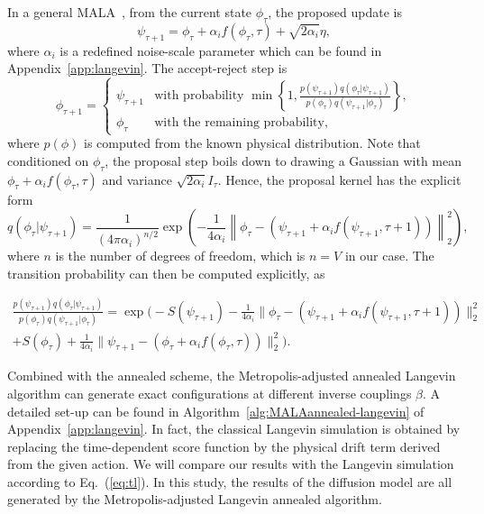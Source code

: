 \documentclass[a4paper,11pt]{article}
\begin{document}
In a general MALA~\cite{roberts1998optimal,girolami2011riemann}, from the current state $\phi_\tau$, the proposed update is
\begin{equation}
    \psi_{\tau+1} = \phi_\tau + \alpha_i f(\phi_\tau,\tau) + \sqrt{2\alpha_i} \eta, 
\end{equation}
where $\alpha_i $ is a redefined noise-scale parameter which can be found in Appendix~\ref{app:langevin}. The accept-reject step is
\begin{equation}
\phi_{\tau+1} =
    \begin{cases} 
    \psi_{\tau+1} & \text{with probability } \min\left\{1, \frac{p(\psi_{\tau+1}) q(\phi_\tau|\psi_{\tau+1})}{p(\phi_\tau) q(\psi_{\tau+1}|\phi_\tau)} \right\}, \\
    \phi_\tau & \text{with the remaining probability,}
    \end{cases}
\end{equation}
where $p(\phi)$ is computed from the known physical distribution. Note that conditioned on $\phi_\tau$, the proposal step boils down to drawing a Gaussian with mean $ \phi_\tau + \alpha_i f(\phi_{\tau},\tau)$ and variance $\sqrt{2\alpha_i} I_\tau$. Hence, the proposal kernel has the explicit form
\begin{equation}
q(\phi_\tau|\psi_{\tau+1}) = \frac{1}{(4 \pi\alpha_i)^{n/2}} \exp\left(-\frac{1}{4\alpha_i}
\left\|\phi_\tau - (\psi_{\tau+1} +  \alpha_i f(\psi_{\tau+1},\tau+1))\right\|_2^2\right),
\end{equation}
where $n$ is the number of degrees of freedom, which is $n=V$ in our case. The transition probability can then be computed explicitly, as

\begin{align}
\frac{p(\psi_{\tau+1}) q(\phi_\tau|\psi_{\tau+1})}{p(\phi_\tau) q(\psi_{\tau+1}|{\phi_\tau})} = 
\exp\bigg(
-S(\psi_{\tau+1}) - \frac{1}{4\alpha_i} \|\phi_\tau - (\psi_{\tau+1} +\alpha_i f(\psi_{\tau+1},\tau+1))\|_2^2 & \nonumber\\
+ S(\phi_\tau) + \frac{1}{4\alpha_i} \|\psi_{\tau+1} - (\phi_{\tau} + \alpha_i f(\phi_{\tau},\tau))\|_2^2
\bigg). &
\end{align}

Combined with the annealed scheme, the Metropolis-adjusted annealed Langevin algorithm can generate exact configurations at different inverse couplings $\beta$. A detailed set-up can be found in Algorithm~\ref{alg:MALAannealed-langevin} of Appendix~\ref{app:langevin}. In fact, the classical Langevin simulation is obtained by replacing the time-dependent score function by the physical drift term derived from the given action. We will compare our results with the Langevin simulation according to Eq.~(\ref{eq:tl}). In this study, the results of the diffusion model are all generated by the Metropolis-adjusted Langevin annealed algorithm.
\end{document}
